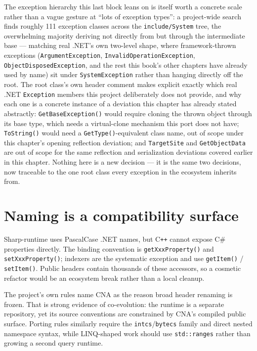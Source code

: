 The exception hierarchy this last block leans on is itself worth a concrete scale rather than a
vague gesture at ``lots of exception types'': a project-wide search finds roughly 111
exception classes across the \texttt{include/System} tree, the overwhelming majority deriving
not directly from  but through the intermediate
 base --- matching real .NET's own two-level shape, where
framework-thrown exceptions (\texttt{ArgumentException}, \texttt{InvalidOperationException},
\texttt{ObjectDisposedException}, and the rest this book's other chapters have already used by
name) sit under \texttt{SystemException} rather than hanging directly off the root. The root
class's own header comment makes explicit exactly which real .NET \texttt{Exception} members
this project deliberately does not provide, and why each one is a concrete instance of a
deviation this chapter has already stated abstractly: \texttt{GetBaseException()} would
require cloning the thrown object through its base type, which needs a virtual-clone mechanism
this port does not have; \texttt{ToString()} would need a \texttt{GetType()}-equivalent class
name, out of scope under this chapter's opening reflection deviation; and \texttt{TargetSite}
and \texttt{GetObjectData} are out of scope for the same reflection and serialization
deviations covered earlier in this chapter. Nothing here is a new decision --- it is the same
two decisions, now traceable to the one root class every exception in the ecosystem inherits
from.

\section{Naming is a compatibility surface}

Sharp-runtime uses PascalCase .NET names, but C\texttt{++} cannot expose C\# properties
directly. The binding convention is \texttt{getXxxProperty()} and
\texttt{setXxxProperty()}; indexers are the systematic exception and use
\texttt{getItem()} / \texttt{setItem()}. Public headers contain thousands of these accessors,
so a cosmetic refactor would be an ecosystem break rather than a local cleanup.

The project's own rules name CNA as the reason broad header renaming is frozen. That is strong
evidence of co-evolution: the runtime is a separate repository, yet its source conventions
are constrained by CNA's compiled public surface. Porting rules similarly require the
\texttt{intcs}/\texttt{bytecs} family and direct nested namespace syntax, while LINQ-shaped
work should use \texttt{std::ranges} rather than growing a second query runtime.

